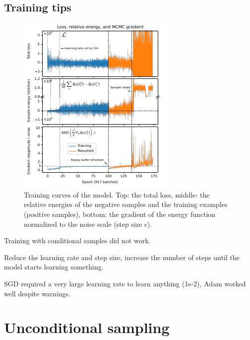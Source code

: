 \subsection{Training tips}

\begin{figure}
	\centering
	\includegraphics[width=\linewidth]{figures/losses-energies-rasterized.pdf}
	\caption{\label{fig:losses-energies}Training curves of the model. Top: the total loss, middle: the relative energies of the negative samples and the training examples (positive samples), bottom: the gradient of the energy function normalized to the noise scale (step size $\epsilon$). }
\end{figure}

Training with conditional samples did not work.

Reduce the learning rate and step size, increase the number of steps until the model starts learning something.

SGD required a very large learning rate to learn anything (1e-2), Adam worked well despite warnings.

\section{Unconditional sampling}

